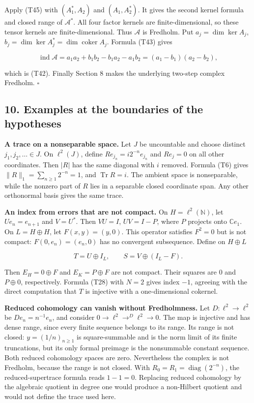 \documentclass[
  11pt,
]{article}
\begin{document}
Apply (T45) with \((A_1^*,A_2)\) and \((A_1,A_2^*)\). It gives the
second kernel formula and closed range of \(\mathcal A^*\). All four
factor kernels are finite-dimensional, so these tensor kernels are
finite-dimensional. Thus \(\mathcal A\) is Fredholm. Put
\(a_j=\dim\ker A_j\),
\(b_j=\dim\ker A_j^*=\dim\operatorname{coker}A_j\). Formula (T43) gives

\[
\operatorname{ind}\mathcal A
=a_1a_2+b_1b_2-b_1a_2-a_1b_2
=(a_1-b_1)(a_2-b_2),
\]

which is (T42). Finally Section 8 makes the underlying two-step complex
Fredholm. \(\square\)

\subsection{10. Examples at the boundaries of the
hypotheses}\label{examples-at-the-boundaries-of-the-hypotheses}

\textbf{A trace on a nonseparable space.} Let \(J\) be uncountable and
choose distinct \(j_1,j_2,\ldots\in J\). On \(\ell^2(J)\), define
\(Re_{j_n}=i2^{-n}e_{j_n}\) and \(Re_j=0\) on all other coordinates.
Then \(|R|\) has the same diagonal with \(i\) removed. Formula (T6)
gives \(\|R\|_1=\sum_{n\geq1}2^{-n}=1\), and \(\operatorname{Tr}R=i\).
The ambient space is nonseparable, while the nonzero part of \(R\) lies
in a separable closed coordinate span. Any other orthonormal basis gives
the same trace.

\textbf{An index from errors that are not compact.} On
\(H=\ell^2(\mathbb N)\), let \(Ue_n=e_{n+1}\) and \(V=U^*\). Then
\(VU=I\), \(UV=I-P\), where \(P\) projects onto \(\mathbb Ce_1\). On
\(L=H\oplus H\), let \(F(x,y)=(y,0)\). This operator satisfies \(F^2=0\)
but is not compact: \(F(0,e_n)=(e_n,0)\) has no convergent subsequence.
Define on \(H\oplus L\)

\[
T=U\oplus I_L,\qquad S=V\oplus(I_L-F).
\]

Then \(E_H=0\oplus F\) and \(E_K=P\oplus F\) are not compact. Their
squares are \(0\) and \(P\oplus0\), respectively. Formula (T28) with
\(N=2\) gives index \(-1\), agreeing with the direct computation that
\(T\) is injective with a one-dimensional cokernel.

\textbf{Reduced cohomology can vanish without Fredholmness.} Let
\(D:\ell^2\to\ell^2\) be \(De_n=n^{-1}e_n\), and consider
\(0\to\ell^2\mathop{\to}^{D}\ell^2\to0\). The map is injective and has
dense range, since every finite sequence belongs to its range. Its range
is not closed: \(y=(1/n)_{n\geq1}\) is square-summable and is the norm
limit of its finite truncations, but its only formal preimage is the
nonsummable constant sequence. Both reduced cohomology spaces are zero.
Nevertheless the complex is not Fredholm, because the range is not
closed. With \(R_0=R_1=\operatorname{diag}(2^{-n})\), the
reduced-supertrace formula reads \(1-1=0\). Replacing reduced cohomology
by the algebraic quotient in degree one would produce a non-Hilbert
quotient and would not define the trace used here.
\end{document}
